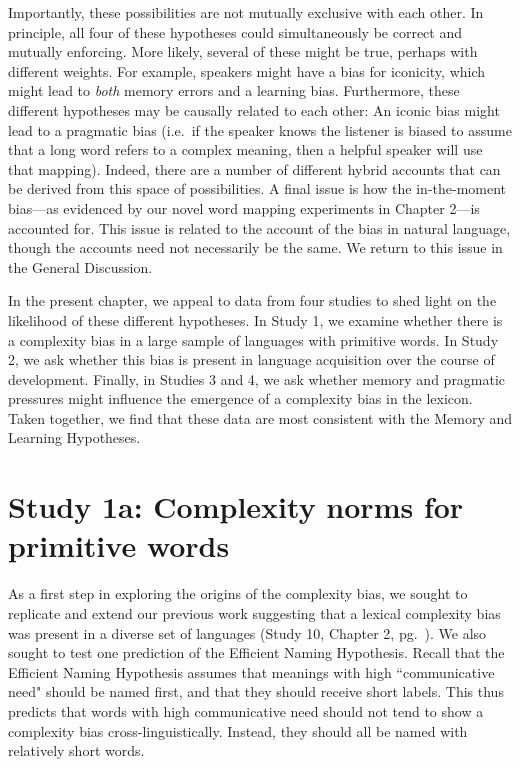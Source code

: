 Importantly, these possibilities are not mutually exclusive with each other. In principle, all four of these hypotheses could simultaneously be correct and mutually enforcing. More likely, several of these might be true, perhaps with different weights. For example, speakers might have a bias for iconicity, which might lead to {\it both} memory errors and a learning bias. Furthermore, these different hypotheses may be causally related to each other: An iconic bias might lead to a pragmatic bias (i.e.\ if the speaker knows the listener is biased to assume that a long word refers to a complex meaning, then a helpful speaker will use that mapping). Indeed, there are a number of different hybrid accounts that can be derived from this space of possibilities. A final issue is how the in-the-moment bias---as evidenced by our novel word mapping experiments in Chapter 2---is accounted for. This issue is related to the account of the bias in natural language, though the accounts need not necessarily be the same. We return to this issue in the General Discussion.

In the present chapter, we appeal to data from four studies to shed light on the likelihood of these different hypotheses. In Study 1, we examine whether there is a complexity bias in a large sample of languages with primitive words. In Study 2, we ask whether this bias is present in language acquisition over the course of development. Finally, in Studies 3 and 4, we ask whether memory and pragmatic pressures might influence the emergence of a complexity bias in the lexicon. Taken together, we find that these data are most consistent with the Memory and Learning Hypotheses. 


\section{Study 1a: Complexity norms for primitive words}
As a first step in exploring the origins of the complexity bias, we sought to replicate and extend our previous work suggesting that a lexical complexity bias was present in a diverse set of languages (Study 10, Chapter 2, pg.\ \pageref{ch2-10}). We also sought to test one prediction of the Efficient Naming Hypothesis. Recall that the Efficient Naming Hypothesis assumes that  meanings with high ``communicative need" should be named first, and that they should receive short labels. This thus predicts that words with high communicative need should not tend  to show a complexity bias cross-linguistically. Instead, they should all be named with relatively short words.

